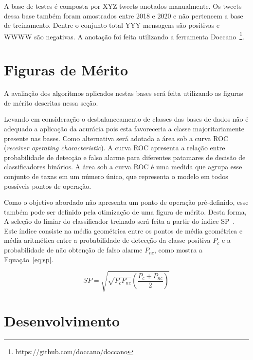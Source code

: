 A base de testes é composta por XYZ tweets anotados manualmente.
Os tweets dessa base também foram amostrados entre 2018 e 2020 e não pertencem a
base de treinamento.
Dentre o conjunto total YYY mensagens são positivas e WWWW são negativas.
A anotação foi feita utilizando a ferramenta
Doccano~\footnote{https://github.com/doccano/doccano}.

\section{Figuras de Mérito}

A avaliação dos algoritmos aplicados nestas bases será feita utilizando as figuras
de mérito descritas nessa seção.

Levando em consideração o desbalanceamento de classes das bases de dados não é
adequado a aplicação da acurácia pois esta favoreceria a classe majoritariamente
presente nas bases.
Como alternativa será adotada a área sob a curva ROC (\textit{receiver operating
characteristic}).
A curva ROC apresenta a relação entre probabilidade de detecção e falso alarme
para diferentes patamares de decisão de classificadores binários.
A área sob a curva ROC é uma medida que agrupa esse conjunto de taxas em um
número único, que representa o modelo em todos possíveis pontos de operação.

Como o objetivo abordado não apresenta um ponto de operação pré-definido, esse
também pode ser definido pela otimização de uma figura de mérito.
Desta forma, A seleção do limiar do classificador treinado será feita a partir do
índice SP~\cite{ciodaro12}.
Este índice consiste na média geométrica entre os pontos de média geométrica e
média aritmética entre a probabilidade de detecção da classe positiva $P_c$ e a
probabilidade de não obtenção de falso alarme $P_{nc}$, como mostra a
Equação~\ref{eq:sp}.

\begin{equation} \label{eq:sp}
    SP = \sqrt{\sqrt{P_c P_{nc}} \left(\frac{P_c + P_{nc}}{2}\right)}
\end{equation}

\section{Desenvolvimento}
